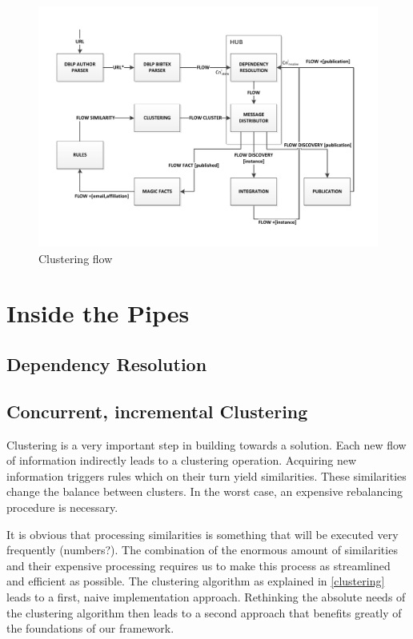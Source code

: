 \begin{figure}[htb]
	\centering
		\includegraphics[width=1\textwidth]{fig/completepipesmall}
	\caption{Clustering flow}
	\label{fig:completepipesmall}
\end{figure}

\section{Inside the Pipes}

\subsection{Dependency Resolution}

\subsection{Concurrent, incremental Clustering}

Clustering is a very important step in building towards a solution. Each new flow of information indirectly leads to a clustering operation. Acquiring new information triggers rules which on their turn yield similarities. These similarities change the balance between clusters. In the worst case, an expensive rebalancing procedure is necessary.

It is obvious that processing similarities is something that will be executed very frequently (numbers?). The combination of the enormous amount of similarities and their expensive processing requires us to make this process as streamlined and efficient as possible. The clustering algorithm as explained in \autoref{clustering} leads to a first, naive implementation approach. Rethinking the absolute needs of the clustering algorithm then leads to a second approach that benefits greatly of the foundations of our framework.

